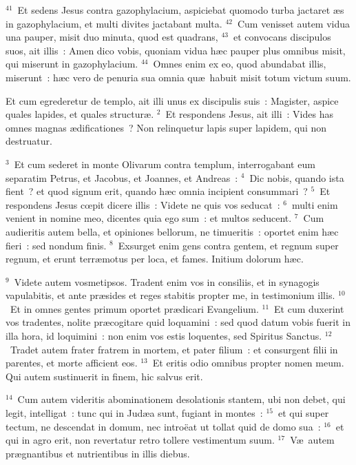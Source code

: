 ${}^{41}$~Et sedens Jesus contra gazophylacium, aspiciebat quomodo turba jactaret \ae s in gazophylacium, et multi divites jactabant multa.
${}^{42}$~Cum venisset autem vidua una pauper, misit duo minuta, quod est quadrans,
${}^{43}$~et convocans discipulos suos, ait illis~: Amen dico vobis, quoniam vidua h\ae c pauper plus omnibus misit, qui miserunt in gazophylacium.
${}^{44}$~Omnes enim ex eo, quod abundabat illis, miserunt~: h\ae c vero de penuria sua omnia qu\ae\ habuit misit totum victum suum.

\lettrine[lines=3,image=true,loversize=0.05,lraise=-0.03]{E}{}t cum egrederetur de templo, ait illi unus ex discipulis suis~: Magister, aspice quales lapides, et quales structur\ae .
${}^{2}$~Et respondens Jesus, ait illi~: Vides has omnes magnas \ae dificationes~? Non relinquetur lapis super lapidem, qui non destruatur.


${}^{3}$~Et cum sederet in monte Olivarum contra templum, interrogabant eum separatim Petrus, et Jacobus, et Joannes, et Andreas~:
${}^{4}$~Dic nobis, quando ista fient~? et quod signum erit, quando h\ae c omnia incipient consummari~?
${}^{5}$~Et respondens Jesus cœpit dicere illis~: Videte ne quis vos seducat~:
${}^{6}$~multi enim venient in nomine meo, dicentes quia ego sum~: et multos seducent.
${}^{7}$~Cum audieritis autem bella, et opiniones bellorum, ne timueritis~: oportet enim h\ae c fieri~: sed nondum finis.
${}^{8}$~Exsurget enim gens contra gentem, et regnum super regnum, et erunt terr\ae motus per loca, et fames. Initium dolorum h\ae c.


${}^{9}$~Videte autem vosmetipsos. Tradent enim vos in consiliis, et in synagogis vapulabitis, et ante pr\ae sides et reges stabitis propter me, in testimonium illis.
${}^{10}$~Et in omnes gentes primum oportet pr\ae dicari Evangelium.
${}^{11}$~Et cum duxerint vos tradentes, nolite pr\ae cogitare quid loquamini~: sed quod datum vobis fuerit in illa hora, id loquimini~: non enim vos estis loquentes, sed Spiritus Sanctus.
${}^{12}$~Tradet autem frater fratrem in mortem, et pater filium~: et consurgent filii in parentes, et morte afficient eos.
${}^{13}$~Et eritis odio omnibus propter nomen meum. Qui autem sustinuerit in finem, hic salvus erit.


${}^{14}$~Cum autem videritis abominationem desolationis stantem, ubi non debet, qui legit, intelligat~: tunc qui in Jud\ae a sunt, fugiant in montes~:
${}^{15}$~et qui super tectum, ne descendat in domum, nec intro\"eat ut tollat quid de domo sua~:
${}^{16}$~et qui in agro erit, non revertatur retro tollere vestimentum suum.
${}^{17}$~V\ae\ autem pr\ae gnantibus et nutrientibus in illis diebus.


